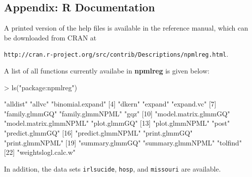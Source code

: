 \documentclass[a4paper]{article}
\begin{document}
\begin{landscape}
\section{Appendix: R Documentation}

A printed version of the help files is available in the reference manual, which can be downloaded from CRAN at

\begin{center}
{\tt http://cran.r-project.org/src/contrib/Descriptions/npmlreg.html}.
\end{center}

A list of all functions currently availabe in {\bf npmlreg} is given below:

\begin{Schunk}
\begin{Sinput}
> ls("package:npmlreg")
\end{Sinput}
\begin{Soutput}
 [1] "alldist"               "allvc"                 "binomial.expand"      
 [4] "dkern"                 "expand"                "expand.vc"            
 [7] "family.glmmGQ"         "family.glmmNPML"       "gqz"                  
[10] "model.matrix.glmmGQ"   "model.matrix.glmmNPML" "plot.glmmGQ"          
[13] "plot.glmmNPML"         "post"                  "predict.glmmGQ"       
[16] "predict.glmmNPML"      "print.glmmGQ"          "print.glmmNPML"       
[19] "summary.glmmGQ"        "summary.glmmNPML"      "tolfind"              
[22] "weightslogl.calc.w"   
\end{Soutput}
\end{Schunk}

In addition, the data sets \texttt{irlsucide}, \texttt{hosp}, and \texttt{missouri} are available.
\end{landscape}
\end{document}
